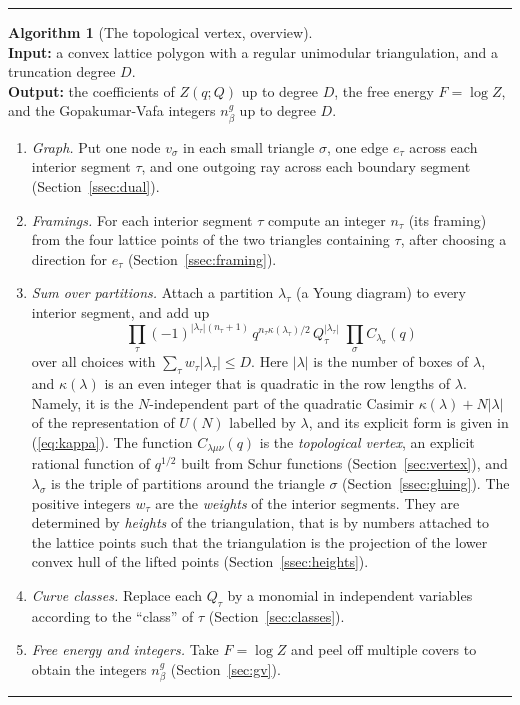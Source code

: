 \documentclass[11pt]{article}
\theoremstyle{plain}
\theoremstyle{definition}
\newtheorem{algo}{Algorithm}
\theoremstyle{remark}
\newenvironment{algobox}{\par\medskip\noindent\begin{minipage}{\linewidth}\hrule\smallskip}{\smallskip\hrule\end{minipage}\par\medskip}
\begin{document}
\begin{algobox}
\setcounter{algo}{-1}
\begin{algo}[The topological vertex, overview]\label{alg:overview}\ \\
\textbf{Input:} a convex lattice polygon with a regular unimodular triangulation, and a
truncation degree $D$.\\
\textbf{Output:} the coefficients of $Z(q;Q)$ up to degree $D$, the free energy $F=\log Z$, and
the Gopakumar-Vafa integers $n^g_\beta$ up to degree $D$.
\begin{enumerate}
\item \textit{Graph.} Put one node $v_\sigma$ in each small triangle $\sigma$, one edge $e_\tau$
across each interior segment $\tau$, and one outgoing ray across each boundary segment
(Section~\ref{ssec:dual}).
\item \textit{Framings.} For each interior segment $\tau$ compute an integer $n_\tau$ (its
framing) from the four lattice points of the two triangles containing $\tau$, after choosing a
direction for $e_\tau$ (Section~\ref{ssec:framing}).
\item \textit{Sum over partitions.} Attach a partition $\lambda_\tau$ (a Young diagram) to every
interior segment, and add up
\begin{equation}
\prod_\tau (-1)^{|\lambda_\tau|(n_\tau+1)}\,q^{n_\tau\kappa(\lambda_\tau)/2}\,
Q_\tau^{|\lambda_\tau|}\;\prod_\sigma C_{\lambda_\sigma}(q)
\end{equation}
over all choices with $\sum_\tau w_\tau|\lambda_\tau|\le D$. Here $|\lambda|$ is the number of
boxes of $\lambda$, and $\kappa(\lambda)$ is an even integer that is quadratic in the row
lengths of $\lambda$. Namely, it is the $N$-independent part of the quadratic Casimir
$\kappa(\lambda)+N|\lambda|$ of the representation of $U(N)$ labelled by $\lambda$, and its
explicit form is given in (\ref{eq:kappa}). The function $C_{\lambda\mu\nu}(q)$ is the
\textit{topological vertex}, an explicit rational function of $q^{1/2}$ built from Schur
functions (Section~\ref{sec:vertex}), and $\lambda_\sigma$ is the triple of partitions around
the triangle $\sigma$ (Section~\ref{ssec:gluing}). The positive integers $w_\tau$ are the
\textit{weights} of the interior segments. They are determined by \textit{heights} of the
triangulation, that is by numbers attached to the lattice points such that the triangulation is
the projection of the lower convex hull of the lifted points (Section~\ref{ssec:heights}).
\item \textit{Curve classes.} Replace each $Q_\tau$ by a monomial in independent variables
according to the ``class'' of $\tau$ (Section~\ref{sec:classes}).
\item \textit{Free energy and integers.} Take $F=\log Z$ and peel off multiple covers to obtain the
integers $n^g_\beta$ (Section~\ref{sec:gv}).
\end{enumerate}
\end{algo}
\end{algobox}
\end{document}
